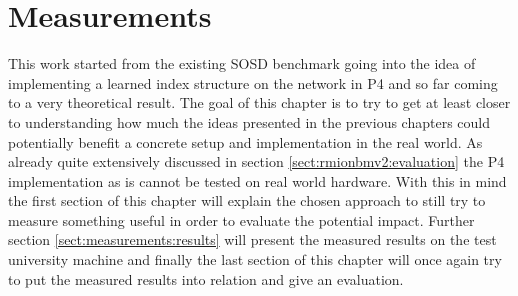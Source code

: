 
\chapter{Measurements}
\label{ch:measurements}
This work started from the existing SOSD benchmark going into the idea of implementing a learned index structure on the network in P4 and so far coming to a very theoretical result. The goal of this chapter is to try to get at least closer to understanding how much the ideas presented in the previous chapters could potentially benefit a concrete setup and implementation in the real world. As already quite extensively discussed in section \ref{sect:rmionbmv2:evaluation} the P4 implementation as is cannot be tested on real world hardware. With this in mind the first section of this chapter will explain the chosen approach to still try to measure something useful in order to evaluate the potential impact. Further section \ref{sect:measurements:results} will present the measured results on the test university machine and finally the last section of this chapter will once again try to put the measured results into relation and give an evaluation.


